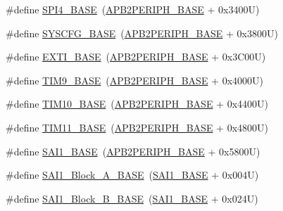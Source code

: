 \begin{DoxyCompactItemize}
\item 
\#define \hyperlink{group___peripheral__memory__map_gac5cfaedf263cee1e79554665f921c708}{S\+P\+I4\+\_\+\+B\+A\+SE}~(\hyperlink{group___peripheral__memory__map_ga25b99d6065f1c8f751e78f43ade652cb}{A\+P\+B2\+P\+E\+R\+I\+P\+H\+\_\+\+B\+A\+SE} + 0x3400\+U)
\item 
\#define \hyperlink{group___peripheral__memory__map_ga62246020bf3b34b6a4d8d0e84ec79d3d}{S\+Y\+S\+C\+F\+G\+\_\+\+B\+A\+SE}~(\hyperlink{group___peripheral__memory__map_ga25b99d6065f1c8f751e78f43ade652cb}{A\+P\+B2\+P\+E\+R\+I\+P\+H\+\_\+\+B\+A\+SE} + 0x3800\+U)
\item 
\#define \hyperlink{group___peripheral__memory__map_ga87371508b3bcdcd98cd1ec629be29061}{E\+X\+T\+I\+\_\+\+B\+A\+SE}~(\hyperlink{group___peripheral__memory__map_ga25b99d6065f1c8f751e78f43ade652cb}{A\+P\+B2\+P\+E\+R\+I\+P\+H\+\_\+\+B\+A\+SE} + 0x3\+C00\+U)
\item 
\#define \hyperlink{group___peripheral__memory__map_ga92ae902be7902560939223dd765ece08}{T\+I\+M9\+\_\+\+B\+A\+SE}~(\hyperlink{group___peripheral__memory__map_ga25b99d6065f1c8f751e78f43ade652cb}{A\+P\+B2\+P\+E\+R\+I\+P\+H\+\_\+\+B\+A\+SE} + 0x4000\+U)
\item 
\#define \hyperlink{group___peripheral__memory__map_ga3eff32f3801db31fb4b61d5618cad54a}{T\+I\+M10\+\_\+\+B\+A\+SE}~(\hyperlink{group___peripheral__memory__map_ga25b99d6065f1c8f751e78f43ade652cb}{A\+P\+B2\+P\+E\+R\+I\+P\+H\+\_\+\+B\+A\+SE} + 0x4400\+U)
\item 
\#define \hyperlink{group___peripheral__memory__map_ga3a4a06bb84c703084f0509e105ffaf1d}{T\+I\+M11\+\_\+\+B\+A\+SE}~(\hyperlink{group___peripheral__memory__map_ga25b99d6065f1c8f751e78f43ade652cb}{A\+P\+B2\+P\+E\+R\+I\+P\+H\+\_\+\+B\+A\+SE} + 0x4800\+U)
\item 
\#define \hyperlink{group___peripheral__memory__map_ga24c1053b754946b512f9c31123e09d21}{S\+A\+I1\+\_\+\+B\+A\+SE}~(\hyperlink{group___peripheral__memory__map_ga25b99d6065f1c8f751e78f43ade652cb}{A\+P\+B2\+P\+E\+R\+I\+P\+H\+\_\+\+B\+A\+SE} + 0x5800\+U)
\item 
\#define \hyperlink{group___peripheral__memory__map_ga31f72e5e5d7aea23bc8a5191bc32e900}{S\+A\+I1\+\_\+\+Block\+\_\+\+A\+\_\+\+B\+A\+SE}~(\hyperlink{group___peripheral__memory__map_ga24c1053b754946b512f9c31123e09d21}{S\+A\+I1\+\_\+\+B\+A\+SE} + 0x004\+U)
\item 
\#define \hyperlink{group___peripheral__memory__map_gacdb59b321830def8c7a57c154178bc48}{S\+A\+I1\+\_\+\+Block\+\_\+\+B\+\_\+\+B\+A\+SE}~(\hyperlink{group___peripheral__memory__map_ga24c1053b754946b512f9c31123e09d21}{S\+A\+I1\+\_\+\+B\+A\+SE} + 0x024\+U)

\end{DoxyCompactItemize}
